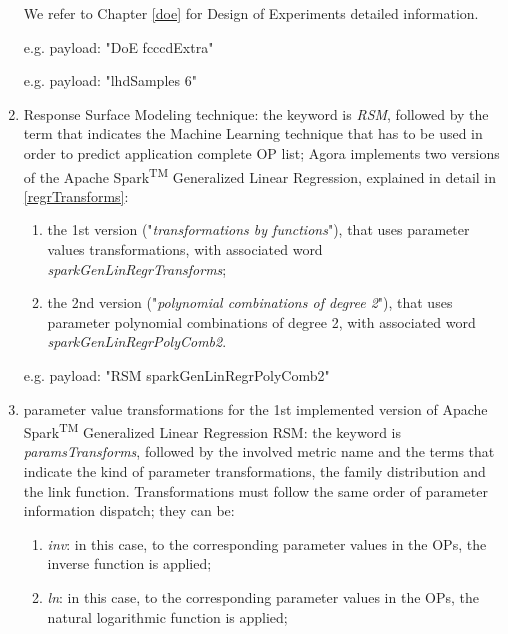 \begin{enumerate}
\begin{enumerate}
    \end{enumerate}
    
    We refer to Chapter \ref{doe} for Design of Experiments detailed information.
    
    e.g. payload: "DoE fcccdExtra"
    
    e.g. payload: "lhdSamples 6"
    
    \item Response Surface Modeling technique: the keyword is \textit{RSM}, followed by the term that indicates the Machine Learning technique that has to be used in order to predict application complete OP list; Agora implements two versions of the Apache Spark\textsuperscript{TM} Generalized Linear Regression, explained in detail in \ref{regrTransforms}:
    
    \begin{enumerate}
    
        \item the 1st version ("\textit{transformations by functions}"), that uses parameter values transformations, with associated word \textit{sparkGenLinRegrTransforms};
        
        \item the 2nd version ("\textit{polynomial combinations of degree 2}"), that uses parameter polynomial combinations of degree 2, with associated word \textit{sparkGenLinRegrPolyComb2}.
    
    \end{enumerate}
    
    e.g. payload: "RSM sparkGenLinRegrPolyComb2"
    
    \item parameter value transformations for the 1st implemented version of Apache Spark\textsuperscript{TM} Generalized Linear Regression RSM: the keyword is \textit{paramsTransforms}, followed by the involved metric name and the terms that indicate the kind of parameter transformations, the family distribution and the link function. Transformations must follow the same order of parameter information dispatch; they can be:
    
    \begin{enumerate}
    
        \item \textit{inv}: in this case, to the corresponding parameter values in the OPs, the inverse function is applied;
        
        \item \textit{ln}: in this case, to the corresponding parameter values in the OPs, the natural logarithmic function is applied;
        

\end{enumerate}
\end{enumerate}
